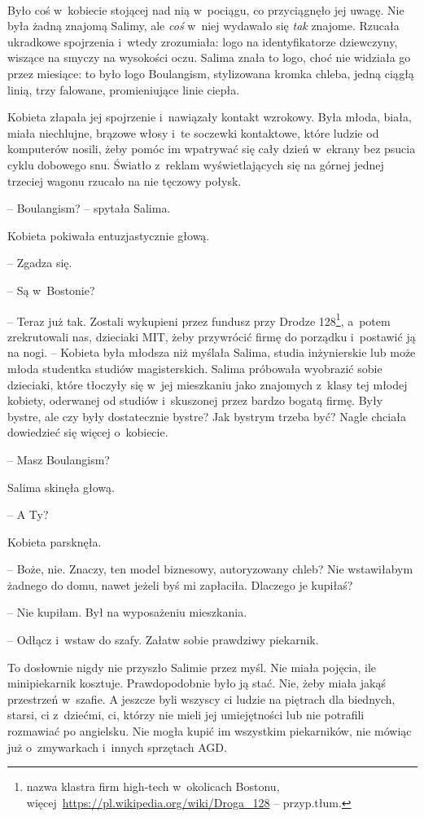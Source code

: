 \documentclass[oneside,polish,11pt,sfheadings]{mwbk}
\begin{document}
~

Było coś w~kobiecie stojącej nad nią w~pociągu, co przyciągnęło jej
uwagę. Nie była żadną znajomą Salimy, ale \textit{coś} w~niej wydawało się
\textit{tak }znajome. Rzucała ukradkowe spojrzenia i~wtedy zrozumiała:
logo na identyfikatorze dziewczyny, wiszące na smyczy na wysokości oczu.
Salima znała to logo, choć nie widziała go przez miesiące: to było logo
Boulangism, stylizowana kromka chleba, jedną ciągłą linią, trzy
falowane, promieniujące linie ciepła.

Kobieta złapała jej spojrzenie i~nawiązały kontakt wzrokowy. Była
młoda, biała, miała niechlujne, brązowe włosy i~te soczewki kontaktowe,
które ludzie od komputerów nosili, żeby pomóc im wpatrywać się cały
dzień w~ekrany bez psucia cyklu dobowego snu. Światło z~reklam
wyświetlających się na górnej jednej trzeciej wagonu rzucało na nie
tęczowy połysk.

-- Boulangism? -- spytała Salima.

Kobieta pokiwała entuzjastycznie głową. 

-- Zgadza się.

-- Są w~Bostonie?

-- Teraz już tak. Zostali wykupieni przez fundusz przy Drodze 128\footnote{
nazwa klastra firm high-tech w~okolicach Bostonu,
więcej~\url{https://pl.wikipedia.org/wiki/Droga\_128} -- przyp.tłum.}, a~potem zrekrutowali nas, dzieciaki MIT, żeby przywrócić
firmę do porządku i~postawić ją na nogi. -- Kobieta była młodsza niż
myślała Salima, studia inżynierskie lub może młoda studentka studiów
magisterskich. Salima próbowała wyobrazić sobie dzieciaki, które
tłoczyły się w~jej mieszkaniu jako znajomych z~klasy tej młodej kobiety,
oderwanej od studiów i~skuszonej przez bardzo bogatą firmę. Były bystre,
ale czy były dostatecznie bystre? Jak bystrym trzeba być? Nagle chciała
dowiedzieć się więcej o~kobiecie.

-- Masz Boulangism?

Salima skinęła głową. 

-- A Ty?

Kobieta parsknęła. 

-- Boże, nie. Znaczy, ten model biznesowy,
autoryzowany chleb? Nie wstawiłabym żadnego do domu, nawet jeżeli byś mi
zapłaciła. Dlaczego je kupiłaś?

-- Nie kupiłam. Był na wyposażeniu mieszkania.

-- Odłącz i~wstaw do szafy. Załatw sobie prawdziwy piekarnik.

To dosłownie nigdy nie przyszło Salimie przez myśl. Nie miała pojęcia,
ile minipiekarnik kosztuje. Prawdopodobnie było ją stać. Nie, żeby miała
jakąś przestrzeń w~szafie. A jeszcze byli wszyscy ci ludzie na piętrach
dla biednych, starsi, ci z~dziećmi, ci, którzy nie mieli jej
umiejętności lub nie potrafili rozmawiać po angielsku. Nie mogła kupić
im wszystkim piekarników, nie mówiąc już o~zmywarkach i~innych sprzętach
AGD.
\end{document}
